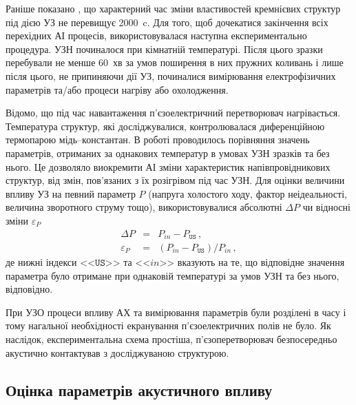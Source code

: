 Раніше показано \cite{Ostapenko1995,YOlikhTPL2011,Ostrovskii2001}, що характерний час зміни властивостей кремнієвих структур під дією УЗ не перевищує 2000~c.
Для того, щоб дочекатися закінчення всіх перехідних АІ процесів, використовувалася наступна експериментально процедура.
УЗН починалося при кімнатній температурі.
Після цього зразки перебували не менше 60~хв за умов поширення в них пружних коливань і лише після цього, не припиняючи дії УЗ, починалися вимірювання електрофізичних параметрів та/або процеси нагріву або охолодження.


Відомо, що під час навантаження п'єзоелектричний перетворювач нагрівається.
Температура структур, які досліджувалися, контролювалася диференційною термопарою мідь--константан.
В роботі проводилось порівняння значень параметрів, отриманих за однакових температур в умовах УЗН зразків та без нього.
Це дозволяло виокремити АІ зміни характеристик напівпровідникових структур, від змін, пов'язаних з їх розігрівом під час УЗН.
Для оцінки величини впливу УЗ на певний параметр $P$ (напруга холостого ходу, фактор неідеальності, величина зворотного струму тощо),
використовувалися абсолютні
$\Delta P$ чи відносні зміни $\varepsilon_P$
\begin{eqnarray}
  \label{eqAbsDelta} \Delta P &=& P_{in}-P_\mathtt{US}\,, \\
  \label{eqEpsDelta} \varepsilon_P &=& (P_{in}-P_\mathtt{US})/P_{in}\,,
\end{eqnarray}
де нижні індекси <<$\mathtt{US}$>> та <<$in$>> вказують на те, що відповідне значення параметра було отримане при однаковій температурі за умов УЗН та без нього, відповідно.

При УЗО процеси впливу АХ та вимірювання параметрів були розділені в часу і тому нагальної необхідності екранування п'єзоелектричних полів не було.
Як наслідок, експериментальна схема простіша, п'єзоперетворювач безпосередньо акустично контактував з досліджуваною структурою.


\subsection{Оцінка параметрів акустичного впливу\label{SC:USL}}


